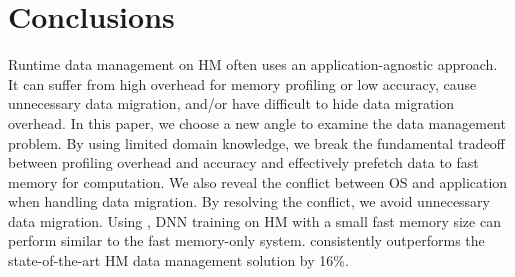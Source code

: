 \vspace{-2pt}
\section{Conclusions}
\vspace{-1pt}
Runtime data management on HM often uses an application-agnostic approach. It can suffer from high overhead for memory profiling or low accuracy, cause unnecessary data migration, and/or have difficult to hide data migration overhead. In this paper, we choose 
a new angle to examine the data management problem. By using limited domain knowledge, %
we break the fundamental tradeoff between profiling overhead and accuracy and effectively prefetch data to fast memory for computation. We also reveal the conflict between OS and application when handling data migration. By resolving the conflict, we avoid unnecessary data migration. 
Using \name, DNN training on HM with a small fast memory size can perform similar to the fast memory-only system. \name consistently outperforms the state-of-the-art HM data management solution by 16\%.


